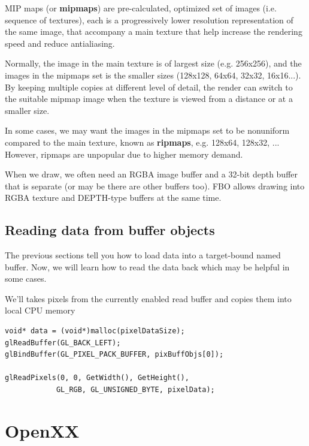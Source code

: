 \begin{framed}
  MIP maps (or {\bf mipmaps}) are pre-calculated, optimized set of
  images (i.e. sequence of textures), each is a progressively lower
  resolution representation of the same image, that accompany a main
  texture that help increase the rendering speed and reduce
  antialiasing.

  Normally, the image in the main texture is of largest size
  (e.g. 256x256), and the images in the mipmaps set is the smaller
  sizes (128x128, 64x64, 32x32, 16x16...).  By keeping multiple copies
  at different level of detail, the render can switch to the suitable
  mipmap image when the texture is viewed from a distance or at a
  smaller size.

  In some cases, we may want the images in the mipmaps set to be
  nonuniform compared to the main texture, known as {\bf ripmaps},
  e.g. 128x64, 128x32, ... However, ripmaps are unpopular due to
  higher memory demand. 
\end{framed}

When we draw, we often need an RGBA image buffer and a 32-bit depth
buffer that is separate (or may be there are other buffers too). FBO
allows drawing into RGBA texture and DEPTH-type buffers at the same
time.  

\subsection{Reading data from buffer objects}
\label{sec:reading-data-from}

The previous sections tell you how to load data into a target-bound
named buffer. Now, we will learn how to read the data back which may
be helpful in some cases.

We'll takes pixels from the currently enabled read buffer and copies
them into local CPU memory
\begin{verbatim}
void* data = (void*)malloc(pixelDataSize);
glReadBuffer(GL_BACK_LEFT);
glBindBuffer(GL_PIXEL_PACK_BUFFER, pixBuffObjs[0]);

glReadPixels(0, 0, GetWidth(), GetHeight(), 
            GL_RGB, GL_UNSIGNED_BYTE, pixelData);
\end{verbatim}


\section{OpenXX}
\label{sec:openxx}

